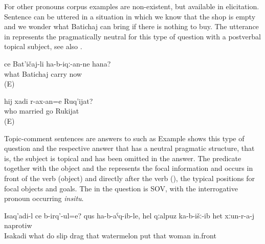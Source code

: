 For other pronouns corpus examples are non-existent, but available in elicitation. Sentence  can be uttered in a situation in which we know that the shop is empty and we wonder what Batichaj can bring if there is nothing to buy. The utterance in  represents the pragmatically neutral  for this type of question with a postverbal topical subject, see also .
%
\begin{exe}
	\ex	\label{ex:What will Batichaj bring now}
	\gll	ce	Bat'ičaj-li	ha-b-iqː-an-ne hana?\\
		what	Batichaj	carry	now\\
	\glt	{} (E)

	\ex	\label{ex:Who should Rukijat marry}
	\gll	hij	xadi	r-ax-an=e	Ruq'ijat?\\
		who	married	go	Rukijat\\
	\glt	{} (E)
\end{exe}

Topic-comment sentences are answers to  such as  Example  shows this type of question and the respective answer that has a neutral pragmatic structure, that is, the subject is topical and has been omitted in the answer. The predicate together with the object and the  represents the focal information and occurs in front of the verb (object) and directly after the verb (), the typical positions for focal objects and goals. The  in the question is SOV, with the interrogative pronoun occurring \textit{insitu}.
%
\begin{exe}
	\ex	\label{ex:What is Isakadi doing? He dragged the watermelon and put it in front of the women}
	\gll	Isaq'adi-l	ce	b-irq'-ul=e?	qus	ha-b-aˁq-ib-le,	hel	qːalpuz	ka-b-išː-ib	het	xːun-r-a-j	naprotiw\\
		Isakadi what	do	slip	drag	that watermelon	put	that	woman in.front\\
	\glt	{}
\end{exe}

